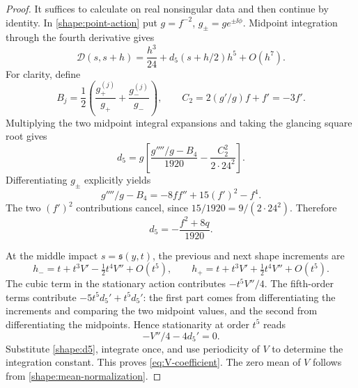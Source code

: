 \begin{proof}
It suffices to calculate on real nonsingular data and then continue
by identity. In \eqref{shape:point-action} put
\(g=f^{-2}\), \(g_\pm=g e^{\pm\ii\phi}\). Midpoint integration
through the fourth derivative gives
\begin{equation}
 \mathcal D(s,s+h)
 =\frac{h^3}{24}+d_5(s+h/2)h^5+O(h^7).
 \label{shape:fifth-action}
\end{equation}
For clarity, define
\[
 B_j=\frac12\left(\frac{g_+^{(j)}}{g_+}
                         +\frac{g_-^{(j)}}{g_-}\right),\qquad
 C_2=2(g'/g)f+f'=-3f'.
\]
Multiplying the two midpoint integral expansions and taking the
glancing square root gives
\[
 d_5=g\left[
       \frac{g''''/g-B_4}{1920}
       -\frac{C_2^2}{2\cdot24^2}\right].
\]
Differentiating \(g_\pm\) explicitly yields
\[
 g''''/g-B_4=-8ff''+15(f')^2-f^4.
\]
The two \((f')^2\) contributions cancel, since
\(15/1920=9/(2\cdot24^2)\). Therefore
\begin{equation}
 d_5=-\frac{f^2+8q}{1920}.
 \label{shape:d5}
\end{equation}

At the middle impact \(s=\mathfrak s(y,t)\), the previous and next
shape increments are
\[
 h_-=t+t^3V'-\tfrac12t^4V''+O(t^5),\qquad
 h_+=t+t^3V'+\tfrac12t^4V''+O(t^5).
\]
The cubic term in the stationary action contributes
\(-t^5V''/4\). The fifth-order terms contribute
\(-5t^5d_5'+t^5d_5'\): the first part comes from differentiating
the increments and comparing the two midpoint values, and the
second from differentiating the midpoints. Hence stationarity at
order \(t^5\) reads
\[
 -V''/4-4d_5'=0.
\]
Substitute \eqref{shape:d5}, integrate once, and use periodicity of
\(V\) to determine the integration constant. This proves
\eqref{eq:V-coefficient}. The zero mean of \(V\) follows from
\eqref{shape:mean-normalization}.
\end{proof}
